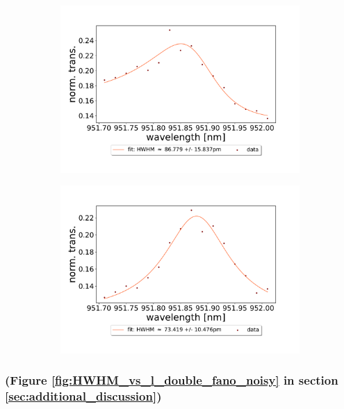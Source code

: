 \begin{figure}[h!]
\begin{subfigure}[b]{0.49\textwidth}
        \caption{}
        \label{fig:30um_M3:M5_fit_2}
    \end{subfigure}
    \begin{subfigure}[b]{0.49\textwidth}
        \includegraphics[width=\textwidth]{figures/results/double fano fits/30um_M3:M5_fit_3.pdf}
        \caption{}
        \label{fig:30um_M3:M5_fit_3}
    \end{subfigure}
    \begin{subfigure}[b]{0.49\textwidth}
        \includegraphics[width=\textwidth]{figures/results/double fano fits/30um_M3:M5_fit_4.pdf}
        \caption{}
        \label{fig:30um_M3:M5_fit_4}
    \end{subfigure}
\end{figure}

\clearpage
\subsubsection*{(Figure \ref{fig:HWHM_vs_l_double_fano_noisy} in section \ref{sec:additional_discussion})}

